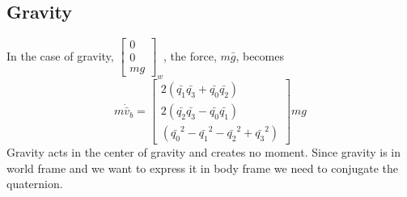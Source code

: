 \subsection{Gravity}
In the case of gravity, $\left[\begin{smallmatrix}0\\0\\mg\end{smallmatrix}\right]_w$, the force, $m \bar{g}$, becomes
\begin{equation}
m \dot{\bar{v}}_b = \left[ \begin{matrix}
    2 (\bar{q_1} \bar{q_3} + \bar{q_0} \bar{q_2})  \\
    2 (\bar{q_2} \bar{q_3} - \bar{q_0} \bar{q_1})  \\
    (\bar{q_0}^2 - \bar{q_1}^2 - \bar{q_2}^2 + \bar{q_3}^2) 
    \end{matrix} \right] m g
\end{equation}
Gravity acts in the center of gravity and creates no moment.
Since gravity is in world frame and we want to express it in body frame we need to conjugate the quaternion.